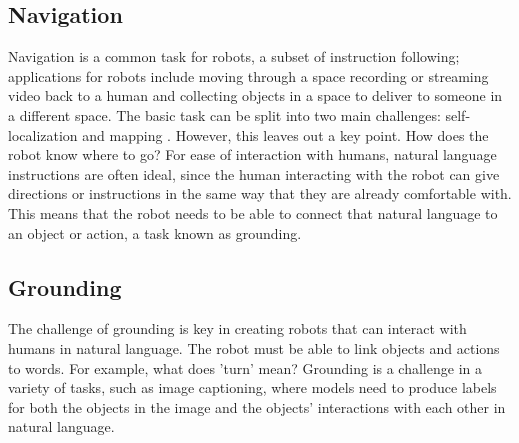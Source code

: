 \documentclass{article}
\begin{document}
\subsection{Navigation}
Navigation is a common task for robots, a subset of instruction following; applications for robots include moving through a space recording or streaming video back to a human and collecting objects in a space to deliver to someone in a different space. The basic task can be split into two main challenges: self-localization and mapping \cite{Wallgrun:2007zr}. However, this leaves out a key point. How does the robot know where to go? For ease of interaction with humans, natural language instructions are often ideal, since the human interacting with the robot can give directions or instructions in the same way that they are already comfortable with. This means that the robot needs to be able to connect that natural language to an object or action, a task known as grounding. 


\subsection{Grounding}
The challenge of grounding is key in creating robots that can interact with humans in natural language. The robot must be able to link objects and actions to words. For example, what does 'turn' mean? Grounding is a challenge in a variety of tasks, such as image captioning, where models need to produce labels for both the objects in the image and the objects' interactions with each other in natural language\cite{karpathy2014captioning}.

\end{document}
